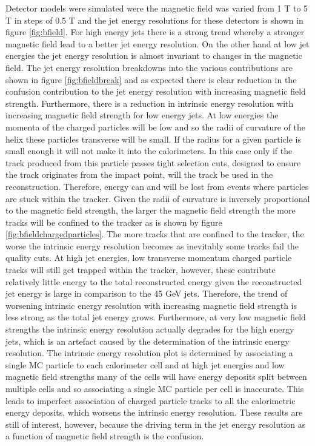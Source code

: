 Detector models were simulated were the magnetic field was varied from 1 T to 5 T in steps of 0.5 T and the jet energy resolutions for these detectors is shown in figure \ref{fig:bfield}.  For high energy jets there is a strong trend whereby a stronger magnetic field lead to a better jet energy resolution.  On the other hand at low jet energies the jet energy resolution is almost invariant to changes in the magnetic field.  The jet energy resolution breakdowns into the various contributions are shown in figure \ref{fig:bfieldbreak} and as expected there is clear reduction in the confusion contribution to the jet energy resolution with increasing magnetic field strength.  Furthermore, there is a reduction in intrinsic energy resolution with increasing magnetic field strength for low energy jets.  At low energies the momenta of the charged particles will be low and so the radii of curvature of the helix these particles transverse will be small.  If the radius for a given particle is small enough it will not make it into the calorimeters.  In this case only if the track produced from this particle passes tight selection cuts, designed to ensure the track originates from the impact point, will the track be used in the reconstruction.  Therefore, energy can and will be lost from events where particles are stuck within the tracker.  Given the radii of curvature is inversely proportional to the magnetic field strength, the larger the magnetic field strength the more tracks will be confined to the tracker as is shown by figure \ref{fig:bfieldchargedparticles}.  The more tracks that are confined to the tracker, the worse the intrinsic energy resolution becomes as inevitably some tracks fail the quality cuts.  At high jet energies, low transverse momentum charged particle tracks will still get trapped within the tracker, however, these contribute relatively little energy to the total reconstructed energy given the reconstructed jet energy is large in comparison to the 45 GeV jets.  Therefore, the trend of worsening intrinsic energy resolution with increasing magnetic field strength is less strong as the total jet energy grows.  Furthermore, at very low magnetic field strengths the intrinsic energy resolution actually degrades for the high energy jets, which is an artefact caused by the determination of the intrinsic energy resolution.  The intrinsic energy resolution plot is determined by associating a single MC particle to each calorimeter cell and at high jet energies and low magnetic field strengths many of the cells will have energy deposits split between multiple cells and so associating a single MC particle per cell is inaccurate.  This leads to imperfect association of charged particle tracks to all the calorimetric energy deposits, which worsens the intrinsic energy resolution.  These results are still of interest, however, because the driving term in the jet energy resolution as a function of magnetic field strength is the confusion.

